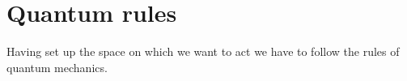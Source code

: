 \section{Quantum rules}
Having set up the space on which we want to act we have to follow the rules of quantum mechanics. 